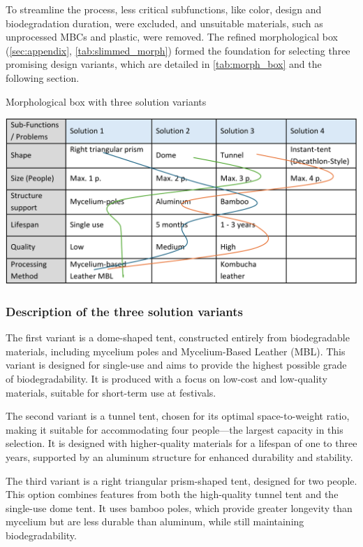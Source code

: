 \documentclass{article}
\begin{document}
To streamline the process, less critical subfunctions, like color, design and
biodegradation duration, were excluded, and unsuitable materials, such as unprocessed
MBCs and plastic, were removed. The refined
morphological box (\autoref{sec:appendix}, \autoref{tab:slimmed_morph}) formed the foundation
for selecting three promising design variants, which are detailed in \autoref{tab:morph_box}
and the following section. 

\begin{table}[ht!]
    \centering
    \caption{Morphological box with three solution variants}
    \includegraphics[width=.85\textwidth]{media/morph_box.png}
    \label{tab:morph_box}
\end{table}

\subsubsection{Description of the three solution variants}
\pph{\color{newgreen}{Variant 1: Dome tent (Single use, Fully biodegradable)}}
The first variant is a dome-shaped tent, constructed entirely from biodegradable materials,
including mycelium poles and Mycelium-Based Leather (MBL). This variant is designed for
single-use and aims to provide the highest possible grade of biodegradability. It is produced
with a focus on low-cost and low-quality materials, suitable for short-term use at festivals.

\pph{\color{neworange}{Variant 2: Tunnel tent (Four-person, Long-lasting)}}
The second variant is a tunnel tent, chosen for its optimal space-to-weight ratio, making it
suitable for accommodating four people—the largest capacity in this selection. It is designed
with higher-quality materials for a lifespan of one to three years, supported by an aluminum
structure for enhanced durability and stability.

\pph{\color{newblue}{Variant 3: Triangular prism tent (Two-person, Medium-lasting)}}
The third variant is a right triangular prism-shaped tent, designed for two people. This option
combines features from both the high-quality tunnel tent and the single-use dome tent. It
uses bamboo poles, which provide greater longevity than mycelium but are less durable
than aluminum, while still maintaining biodegradability.
\end{document}
